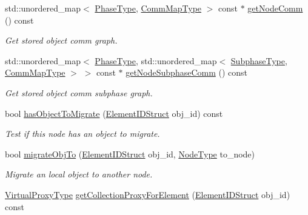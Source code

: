 \begin{DoxyCompactItemize}
std\+::unordered\+\_\+map$<$ \hyperlink{namespacevt_a46ce6733d5cdbd735d561b7b4029f6d7}{Phase\+Type}, \hyperlink{namespacevt_1_1vrt_1_1collection_1_1balance_a01ee1fb0ae2da1d2ab7fdca3be9ae351}{Comm\+Map\+Type} $>$ const  $\ast$ \hyperlink{structvt_1_1vrt_1_1collection_1_1balance_1_1_node_stats_a236c9f6b9ba7446a35cbc1052949d558}{get\+Node\+Comm} () const
\begin{DoxyCompactList}\small\item\em Get stored object comm graph. \end{DoxyCompactList}\item 
std\+::unordered\+\_\+map$<$ \hyperlink{namespacevt_a46ce6733d5cdbd735d561b7b4029f6d7}{Phase\+Type}, std\+::unordered\+\_\+map$<$ \hyperlink{namespacevt_ae78cbfdf1e57470e33eedb074f2beeba}{Subphase\+Type}, \hyperlink{namespacevt_1_1vrt_1_1collection_1_1balance_a01ee1fb0ae2da1d2ab7fdca3be9ae351}{Comm\+Map\+Type} $>$ $>$ const  $\ast$ \hyperlink{structvt_1_1vrt_1_1collection_1_1balance_1_1_node_stats_ae44b616cad5c50a36faeb2cc78457a52}{get\+Node\+Subphase\+Comm} () const
\begin{DoxyCompactList}\small\item\em Get stored object comm subphase graph. \end{DoxyCompactList}\item 
bool \hyperlink{structvt_1_1vrt_1_1collection_1_1balance_1_1_node_stats_a975f917ab141ad5ca7f5905fe281e412}{has\+Object\+To\+Migrate} (\hyperlink{namespacevt_1_1vrt_1_1collection_1_1balance_a9f5b53fafb270212279a4757d2c4cd28}{Element\+I\+D\+Struct} obj\+\_\+id) const
\begin{DoxyCompactList}\small\item\em Test if this node has an object to migrate. \end{DoxyCompactList}\item 
bool \hyperlink{structvt_1_1vrt_1_1collection_1_1balance_1_1_node_stats_a9d35e0496fb2c08f8b760780e64f97ec}{migrate\+Obj\+To} (\hyperlink{namespacevt_1_1vrt_1_1collection_1_1balance_a9f5b53fafb270212279a4757d2c4cd28}{Element\+I\+D\+Struct} obj\+\_\+id, \hyperlink{namespacevt_a866da9d0efc19c0a1ce79e9e492f47e2}{Node\+Type} to\+\_\+node)
\begin{DoxyCompactList}\small\item\em Migrate an local object to another node. \end{DoxyCompactList}\item 
\hyperlink{namespacevt_a1b417dd5d684f045bb58a0ede70045ac}{Virtual\+Proxy\+Type} \hyperlink{structvt_1_1vrt_1_1collection_1_1balance_1_1_node_stats_a3ffd0aa6433163a9d455d6819ac44fca}{get\+Collection\+Proxy\+For\+Element} (\hyperlink{namespacevt_1_1vrt_1_1collection_1_1balance_a9f5b53fafb270212279a4757d2c4cd28}{Element\+I\+D\+Struct} obj\+\_\+id) const

\end{DoxyCompactItemize}

